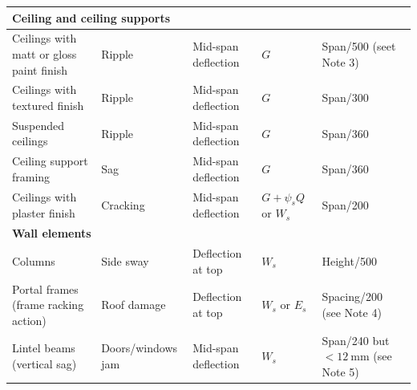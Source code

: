 \begin{table}
\begin{tabular}{lllll}
	\multicolumn{5}{l}{\textbf{Ceiling and ceiling supports}}                                                                                                                                                                  \\ \midrule
	Ceilings with matt or gloss paint finish                         & Ripple                                & Mid-span deflection               & $G$                         & Span/500 (seet Note 3)                        \\
	Ceilings with textured finish                                    & Ripple                                & Mid-span deflection               & $G$                         & Span/300                                      \\
	Suspended ceilings                                               & Ripple                                & Mid-span deflection               & $G$                         & Span/360                                      \\
	Ceiling support framing                                          & Sag                                   & Mid-span deflection               & $G$                         & Span/360                                      \\
	Ceilings with plaster finish                                     & Cracking                              & Mid-span deflection               & $G+\psi_sQ$ or $W_s$        & Span/200                                      \\ \midrule
	\multicolumn{5}{l}{\textbf{Wall elements}}                                                                                                                                                                                 \\ \midrule
	Columns                                                          & Side sway                             & Deflection at top                 & $W_s$                       & Height/500                                    \\
	Portal frames (frame racking action)                             & Roof damage                           & Deflection at top                 & $W_s$ or $E_s$              & Spacing/200 (see Note 4)                      \\
	Lintel beams (vertical sag)                                      & Doors/windows jam                     & Mid-span deflection               & $W_s$                       & Span/240 but $<\SI{12}{\mm}$ (see Note 5)     \\

\end{tabular}
\end{table}
